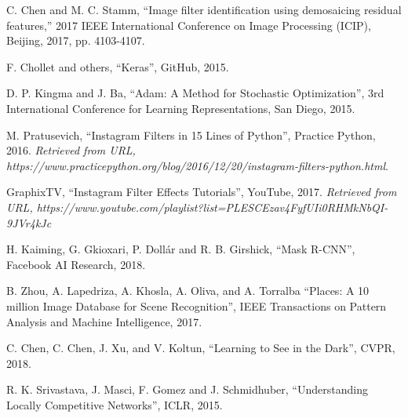 \documentclass[11pt]{article}
\begin{document}
\begin{thebibliography}{9}
C. Chen and M. C. Stamm, ``Image filter identification using demosaicing residual features,'' 2017 IEEE International Conference on Image Processing (ICIP), Beijing, 2017, pp. 4103-4107.

F. Chollet and others, ``Keras'', GitHub, 2015.

D. P. Kingma and J. Ba, ``Adam: A Method for Stochastic Optimization'', 3rd International Conference for Learning Representations, San Diego, 2015.

M. Pratusevich, ``Instagram Filters in 15 Lines of Python'', Practice Python, 2016. \textit{Retrieved from URL, https://www.practicepython.org/blog/2016/12/20/instagram-filters-python.html}.

GraphixTV, ``Instagram Filter Effects Tutorials'', YouTube, 2017. \textit{Retrieved from URL,
https://www.youtube.com/playlist?list=PLESCEzav4FyfUIi0RHMkNbQI-9JVr4kJc}

H. Kaiming, G. Gkioxari, P. Doll{\'{a}}r and R. B. Girshick, ``Mask R-CNN'', Facebook AI Research, 2018.

 B. Zhou, A. Lapedriza, A. Khosla, A. Oliva, and A. Torralba ``Places: A 10 million Image Database for Scene Recognition'', IEEE Transactions on Pattern Analysis and Machine Intelligence, 2017.

C. Chen, C. Chen, J. Xu, and V. Koltun, ``Learning to See in the Dark'', CVPR, 2018.

R. K. Srivastava, J. Masci, F. Gomez and J. Schmidhuber, ``Understanding Locally Competitive Networks'', ICLR, 2015.

\end{thebibliography}
\end{document}

